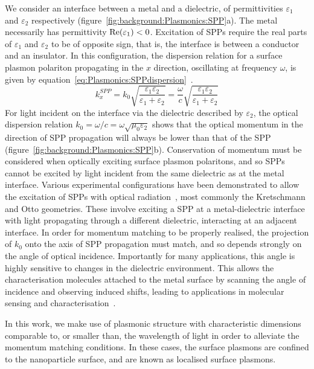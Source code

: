 We consider an interface between a metal and a dielectric, of permittivities $\varepsilon_1$ and $\varepsilon_2$ respectively (figure~\ref{fig:background:Plasmonics:SPP}a). The metal necessarily has permittivity ${\mathop{\rm Re}\nolimits}(\varepsilon_1)<0$. Excitation of SPPs require the real parts of $\varepsilon_1$ and $\varepsilon_2$ to be of opposite sign, that is, the interface is between a conductor and an insulator. In this configuration, the dispersion relation for a surface plasmon polariton propagating in the $x$ direction, oscillating at frequency $\omega$, is given by equation~\ref{eq:Plasmonics:SPPdispersion}~\cite[\S 2.2]{Maier2007}. 
\begin{equation}\label{eq:Plasmonics:SPPdispersion}
    k^{SPP}_{x} = k_0 \sqrt{\frac{\varepsilon_{1}\varepsilon_{2}}{\varepsilon_{1}+\varepsilon_{2}}} = \frac{\omega}{c} \sqrt{\frac{\varepsilon_{1}\varepsilon_{2}}{\varepsilon_{1}+\varepsilon_{2}}}
\end{equation}
For light incident on the interface via the dielectric described by $\varepsilon_2$, the optical dispersion relation $k_0 = \omega / c = \omega \sqrt{\mu_0 \varepsilon_2}$ shows that the optical momentum in the direction of SPP propagation will always be lower than that of the SPP (figure~\ref{fig:background:Plasmonics:SPP}b). Conservation of momentum must be considered when optically exciting surface plasmon polaritons, and so SPPs cannot be excited by light incident from the same dielectric as at the metal interface. Various experimental configurations have been demonstrated to allow the excitation of SPPs with optical radiation~\cite{Maier2007, Roh2011}, most commonly the Kretschmann and Otto geometries. These involve exciting a SPP at a metal-dielectric interface with light propagating through a different dielectric, interacting at an adjacent interface. In order for momentum matching to be properly realised, the projection of $k_0$ onto the axis of SPP propagation must match, and so depends strongly on the angle of optical incidence. Importantly for many applications, this angle is highly sensitive to changes in the dielectric environment. This allows the characterisation molecules attached to the metal surface by scanning the angle of incidence and observing induced shifts, leading to applications in molecular sensing and characterisation~\cite{Roh2011}.

In this work, we make use of plasmonic structure with characteristic dimensions comparable to, or smaller than, the wavelength of light in order to alleviate the momentum matching conditions. In these cases, the surface plasmons are confined to the nanoparticle surface, and are known as localised surface plasmons.


